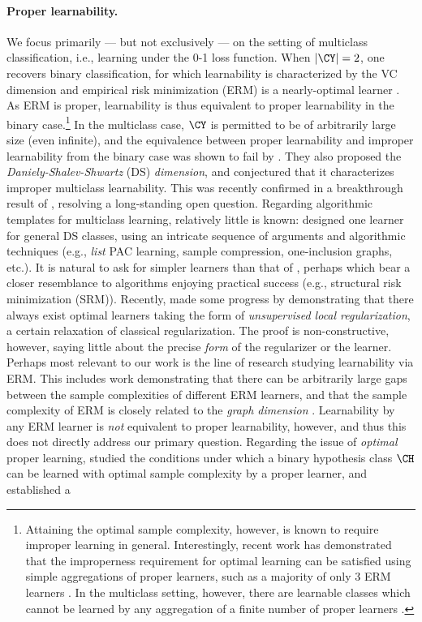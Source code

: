 \documentclass[11pt]{article}
\begin{document}
\paragraph{Proper learnability.} We focus primarily --- but not exclusively --- on the setting of multiclass classification, i.e., learning under the 0-1 loss function. When $|\CY| = 2$, one recovers binary classification, for which learnability is characterized by the VC dimension and empirical risk minimization (ERM) is a nearly-optimal learner \citep{BEHW89,shalev2014understanding}.
As ERM is proper, learnability is thus equivalent to proper learnability in the binary case.\footnote{Attaining the optimal sample complexity, however, is known to require improper learning in general. Interestingly, recent work has demonstrated that the improperness requirement for optimal learning can be satisfied using simple aggregations of proper learners, such as a majority of only 3 ERM learners \citep{hanneke2016optimal,larsen2023bagging,aden2024majority}. In the multiclass setting, however, there are learnable classes which cannot be learned by any aggregation of a finite number of proper learners \citep{asilisunderstanding}.} In the multiclass case, $\CY$ is permitted to be of arbitrarily large size (even infinite), and the equivalence between proper learnability and improper learnability from the binary case was shown to fail by \citet{DS14}. They also proposed the \emph{Daniely-Shalev-Shwartz} (DS) \emph{dimension}, and conjectured that it characterizes improper multiclass learnability. This was recently confirmed in a breakthrough result of \citet{brukhim2022characterization}, resolving a long-standing open question. Regarding algorithmic templates for multiclass learning, relatively little is known: \citet{brukhim2022characterization} designed one learner for general DS classes, using an intricate sequence of arguments and algorithmic techniques (e.g., \emph{list} PAC learning, sample compression, one-inclusion graphs, etc.). It is natural to ask for simpler learners than that of \citet{brukhim2022characterization}, perhaps which bear a closer resemblance to algorithms enjoying practical success (e.g., structural risk minimization (SRM)). Recently, \citet{asilis2024regularization} made some progress by demonstrating that there always exist optimal learners taking the form of \emph{unsupervised local regularization}, a certain relaxation of classical regularization. The proof is non-constructive, however, saying little about the precise \emph{form} of the regularizer or the learner. Perhaps most relevant to our work is the line of research studying learnability via ERM. This includes work demonstrating that there can be arbitrarily large gaps between the sample complexities of different ERM learners, and that the sample complexity of ERM is closely related to the \emph{graph dimension} \citep{daniely2015multiclass}. Learnability by any ERM learner is \emph{not} equivalent to proper learnability, however, and thus this does not directly address our primary question. Regarding the issue of \emph{optimal} proper learning, \citet{bousquet2020proper} studied the conditions under which a binary hypothesis class $\CH$ can be learned with optimal sample complexity by a proper learner, and established a 
\end{document}
